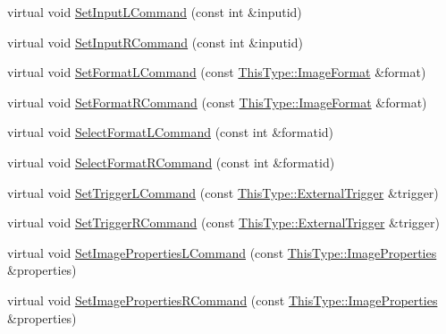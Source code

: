 \begin{DoxyCompactItemize}
\item 
virtual void \hyperlink{classsvl_filter_source_video_capture_afbee99709cde9fc26d88815acfe24d57}{Set\-Input\-L\-Command} (const int \&inputid)
\item 
virtual void \hyperlink{classsvl_filter_source_video_capture_a37f49c97c934e171a3ddae4c06d0bc88}{Set\-Input\-R\-Command} (const int \&inputid)
\item 
virtual void \hyperlink{classsvl_filter_source_video_capture_a1d64fd9952f1eaf7b01b9b31273b8329}{Set\-Format\-L\-Command} (const \hyperlink{classsvl_filter_source_video_capture_a0944cc8abe4240701683128c28fa5349}{This\-Type\-::\-Image\-Format} \&format)
\item 
virtual void \hyperlink{classsvl_filter_source_video_capture_abf61696d18768de36cdfbc1ae47c65af}{Set\-Format\-R\-Command} (const \hyperlink{classsvl_filter_source_video_capture_a0944cc8abe4240701683128c28fa5349}{This\-Type\-::\-Image\-Format} \&format)
\item 
virtual void \hyperlink{classsvl_filter_source_video_capture_a0cdd80a307fa9216000ae363fe8664a8}{Select\-Format\-L\-Command} (const int \&formatid)
\item 
virtual void \hyperlink{classsvl_filter_source_video_capture_ad42cf6d7de3f1c517cf514a5878d5eb8}{Select\-Format\-R\-Command} (const int \&formatid)
\item 
virtual void \hyperlink{classsvl_filter_source_video_capture_ab81e6be420ad82b1c1414ebb1c7ca424}{Set\-Trigger\-L\-Command} (const \hyperlink{classsvl_filter_source_video_capture_a609a8eb75ea23b7b35068207cc3c3144}{This\-Type\-::\-External\-Trigger} \&trigger)
\item 
virtual void \hyperlink{classsvl_filter_source_video_capture_ab534dbc847bc8ee2099035c3e5833133}{Set\-Trigger\-R\-Command} (const \hyperlink{classsvl_filter_source_video_capture_a609a8eb75ea23b7b35068207cc3c3144}{This\-Type\-::\-External\-Trigger} \&trigger)
\item 
virtual void \hyperlink{classsvl_filter_source_video_capture_a24fe5d58190fbc762bcae850dff16645}{Set\-Image\-Properties\-L\-Command} (const \hyperlink{classsvl_filter_source_video_capture_ad5d8ccc6a284be386d49b60574937f4d}{This\-Type\-::\-Image\-Properties} \&properties)
\item 
virtual void \hyperlink{classsvl_filter_source_video_capture_abf3a679658d86ab8d23e27e2fde85e2a}{Set\-Image\-Properties\-R\-Command} (const \hyperlink{classsvl_filter_source_video_capture_ad5d8ccc6a284be386d49b60574937f4d}{This\-Type\-::\-Image\-Properties} \&properties)

\end{DoxyCompactItemize}

